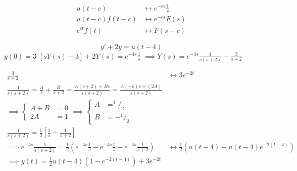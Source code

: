 \documentclass[11pt,a4paper,titlepage,final]{article}
\begin{document}
\begin{align*}
u(t-c) & \leftrightarrow e^{-cs}\frac{1}{s}\\
u(t-c)f(t-c) &\leftrightarrow e^{-cs}F(s) \\
e^{ct}f(t) &\leftrightarrow F(s-c)
\end{align*}

\begin{exercise*}{13.1}
	\[
	y'+2y=u(t-4)
	\]
	\( y(0)=3 \)
	\tcblower
	\( [sY(s)-3]+2Y(s) = e^{-4s}\frac{1}{s} \)
	\( \implies Y(s) = e^{-4s}\frac{1}{s(s+2)}+\frac{3}{s+2} \)

	\begin{align*}
	\frac{3}{s+2} &\leftrightarrow 3e^{-2t}\\
	\frac{1}{s(s+2)} = \frac{A}{s} + \frac{B}{s+2} = \frac{A(s+2)+Bs}{s(s+2)} = \frac{A(+b)s+(2A)}{s(s+2)} \\
	\implies \begin{cases}
	A+B&=0\\2A&=1
	\end{cases} \implies \begin{cases}
A &= ^1/_2 \\ B&= - ^1/_2
	\end{cases} \\
	\frac{1}{s(s+2)} = \frac{1}{2} \left[\frac{1}{s}-\frac{1}{s+2}\right]
	\\ \implies e^{-4s}\frac{1}{s(s+2)} = \frac{1}{2} \left(
	e^{-4s}\frac{1}{s}-e^{-4s}\frac{1}{s}-e^{-4s}\frac{1}{s+2}
	\right) &\leftrightarrow \frac{1}{2}\left(u(t-4)-u(t-4)e^{-2(t-4)}\right)
	\\
	\implies \boxed{
		y(t) = \frac{1}{2}u(t-4)\left(1-e^{-2(t-4)}\right)+3e^{-2t}
	}
\end{align*}
\end{exercise*}
\end{document}
